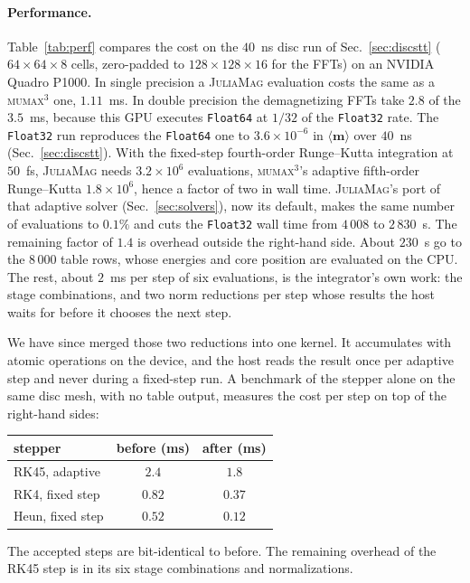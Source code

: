\documentclass{article}      %
\newcommand{\JuliaMag}{\textsc{JuliaMag}}
\newcommand{\mumax}{\textsc{mumax}$^3$}
\newcommand{\vm}{\bm{m}}
\begin{document}
\paragraph{Performance.}
Table~\ref{tab:perf} compares the cost on the $40$~ns disc run of
Sec.~\ref{sec:discstt} ($64\times64\times8$ cells, zero-padded to
$128\times128\times16$ for the FFTs) on an NVIDIA Quadro P1000. In single precision a \JuliaMag{} evaluation
costs the same as a \mumax{} one, $1.11$~ms. In double precision the demagnetizing
FFTs take $2.8$ of the $3.5$~ms, because this GPU executes \texttt{Float64} at
$1/32$ of the \texttt{Float32} rate. The \texttt{Float32} run reproduces the
\texttt{Float64} one to $3.6\times10^{-6}$ in $\langle\vm\rangle$ over $40$~ns
(Sec.~\ref{sec:discstt}). With the fixed-step fourth-order Runge--Kutta
integration at $50$~fs, \JuliaMag{} needs $3.2\times10^{6}$ evaluations, \mumax's
adaptive fifth-order Runge--Kutta $1.8\times10^{6}$, hence a factor of two in
wall time. \JuliaMag's port of that adaptive solver (Sec.~\ref{sec:solvers}),
now its default, makes the same number of evaluations to $0.1\%$ and cuts the
\texttt{Float32} wall time from $4\,008$ to $2\,830$~s. The remaining factor of
$1.4$ is overhead outside the right-hand side. About $230$~s go to the $8\,000$
table rows, whose energies and core position are evaluated on the CPU. The rest,
about $2$~ms per step of six evaluations, is the integrator's own work: the stage
combinations, and two norm reductions per step whose results the host waits for
before it chooses the next step.

We have since merged those two reductions into one kernel. It accumulates with
atomic operations on the device, and the host reads the result once per adaptive
step and never during a fixed-step run. A benchmark of the stepper alone on the
same disc mesh, with no table output, measures the cost per step on top of the
right-hand sides:

\begin{center}
\begin{tabular}{lcc}
  \hline
  stepper & before (ms) & after (ms) \\
  \hline
  RK45, adaptive & $2.4$ & $1.8$ \\
  RK4, fixed step & $0.82$ & $0.37$ \\
  Heun, fixed step & $0.52$ & $0.12$ \\
  \hline
\end{tabular}
\end{center}

\noindent The accepted steps are bit-identical to before. The remaining overhead
of the RK45 step is in its six stage combinations and normalizations.
\end{document}
